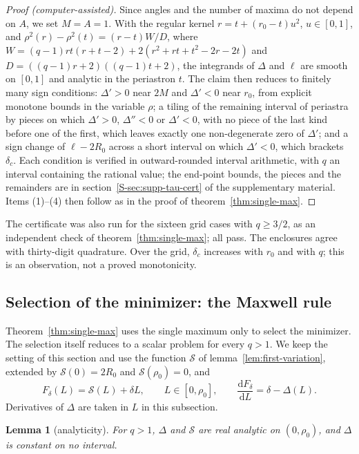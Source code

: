 \documentclass[aip,jmp,amsmath,amssymb,reprint]{revtex4-2}
\newcommand{\dd}{\mathrm{d}}
\theoremstyle{plain}
\newtheorem{lemma}[proposition]{Lemma}
\theoremstyle{definition}
\begin{document}
\begin{proof}[Proof (computer-assisted)]
Since angles and the number of maxima do not depend on $A$, we set $M=A=1$. With the regular kernel
$r=t+(r_0-t)u^2$, $u\in[0,1]$, and $\rho^2(r)-\rho^2(t)=(r-t)W/D$, where
$W=(q-1)rt(r+t-2)+2(r^2+rt+t^2-2r-2t)$ and $D=((q-1)r+2)((q-1)t+2)$, the integrands of $\Delta$ and $\ell$
are smooth on $[0,1]$ and analytic in the periastron $t$. The claim then reduces to finitely many sign
conditions: $\Delta'>0$ near $2M$ and $\Delta'<0$ near $r_0$, from explicit monotone bounds in the variable
$\rho$; a tiling of the remaining interval of periastra by pieces on which $\Delta'>0$, $\Delta''<0$ or
$\Delta'<0$, with no piece of the last kind before one of the first, which leaves exactly one
non-degenerate zero of $\Delta'$; and a sign change of $\ell-2R_0$ across a short interval on which
$\Delta'<0$, which brackets $\delta_c$. Each condition is verified in outward-rounded interval
arithmetic, with $q$ an interval containing the rational value; the end-point bounds, the pieces and
the remainders are in section~\ref{S-sec:supp-tau-cert} of the supplementary material. Items (1)--(4) then
follow as in the proof of theorem~\ref{thm:single-max}.
\end{proof}

The certificate was also run for the sixteen grid cases with $q\ge3/2$, as an independent check of
theorem~\ref{thm:single-max}; all pass.
The enclosures agree with thirty-digit quadrature. Over the grid, $\delta_c$ increases with
$r_0$ and with $q$; this is an observation, not a proved monotonicity.

\subsection{Selection of the minimizer: the Maxwell rule}
Theorem~\ref{thm:single-max} uses the single maximum only to select the minimizer. The
selection itself reduces to a scalar problem for every $q>1$. We keep the setting of this
section and use the function $\mathcal S$ of lemma~\ref{lem:first-variation}, extended by
$\mathcal S(0)=2R_0$ and $\mathcal S(\rho_0)=0$, and
\[
  F_\delta(L)=\mathcal S(L)+\delta L,\qquad L\in[0,\rho_0],\qquad
  \frac{\dd F_\delta}{\dd L}=\delta-\Delta(L).
\]
Derivatives of $\Delta$ are taken in $L$ in this subsection.

\begin{lemma}[analyticity]\label{lem:analytic}
For $q>1$, $\Delta$ and $\mathcal S$ are real analytic on $(0,\rho_0)$, and $\Delta$ is
constant on no interval.
\end{lemma}
\end{document}
